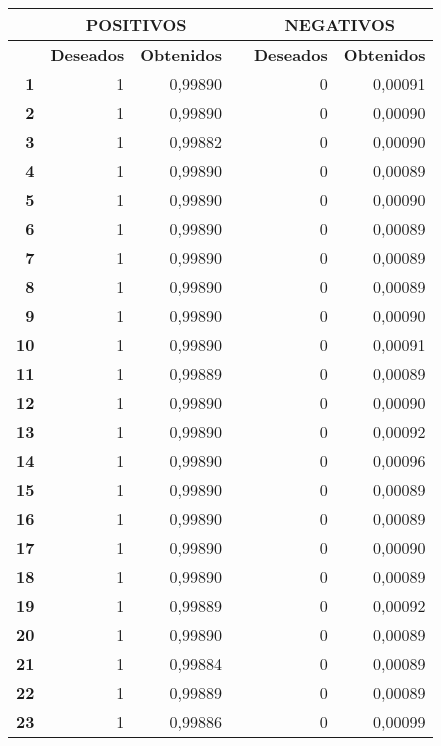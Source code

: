 \begin{longtable}{|r|r|r|l|r|r|}
\hline
\multicolumn{1}{|l|}{} & \multicolumn{2}{c|}{\textbf{POSITIVOS}} &  & \multicolumn{2}{c|}{\textbf{NEGATIVOS}} \\ \hline
\multicolumn{1}{|l|}{} & \multicolumn{1}{c|}{\textbf{Deseados}} & \multicolumn{1}{c|}{\textbf{Obtenidos}} &  & \multicolumn{1}{c|}{\textbf{Deseados}} & \multicolumn{1}{c|}{\textbf{Obtenidos}} \\ \hline
\textbf{1} & 1 & 0,99890 &  & 0 & 0,00091 \\ \hline
\textbf{2} & 1 & 0,99890 &  & 0 & 0,00090 \\ \hline
\textbf{3} & 1 & 0,99882 &  & 0 & 0,00090 \\ \hline
\textbf{4} & 1 & 0,99890 &  & 0 & 0,00089 \\ \hline
\textbf{5} & 1 & 0,99890 &  & 0 & 0,00090 \\ \hline
\textbf{6} & 1 & 0,99890 &  & 0 & 0,00089 \\ \hline
\textbf{7} & 1 & 0,99890 &  & 0 & 0,00089 \\ \hline
\textbf{8} & 1 & 0,99890 &  & 0 & 0,00089 \\ \hline
\textbf{9} & 1 & 0,99890 &  & 0 & 0,00090 \\ \hline
\textbf{10} & 1 & 0,99890 &  & 0 & 0,00091 \\ \hline
\textbf{11} & 1 & 0,99889 &  & 0 & 0,00089 \\ \hline
\textbf{12} & 1 & 0,99890 &  & 0 & 0,00090 \\ \hline
\textbf{13} & 1 & 0,99890 &  & 0 & 0,00092 \\ \hline
\textbf{14} & 1 & 0,99890 &  & 0 & 0,00096 \\ \hline
\textbf{15} & 1 & 0,99890 &  & 0 & 0,00089 \\ \hline
\textbf{16} & 1 & 0,99890 &  & 0 & 0,00089 \\ \hline
\textbf{17} & 1 & 0,99890 &  & 0 & 0,00090 \\ \hline
\textbf{18} & 1 & 0,99890 &  & 0 & 0,00089 \\ \hline
\textbf{19} & 1 & 0,99889 &  & 0 & 0,00092 \\ \hline
\textbf{20} & 1 & 0,99890 &  & 0 & 0,00089 \\ \hline
\textbf{21} & 1 & 0,99884 &  & 0 & 0,00089 \\ \hline
\textbf{22} & 1 & 0,99889 &  & 0 & 0,00089 \\ \hline
\textbf{23} & 1 & 0,99886 &  & 0 & 0,00099 \\ \hline

\end{longtable}
